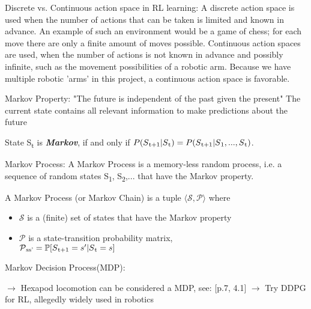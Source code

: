 Discrete vs. Continuous action space in RL learning: 
A discrete action space is used when the number of actions that can be taken is limited and known in advance. An example of such an environment would be a game of chess; for each move there are only a finite amount of moves possible.
Continuous action spaces are used, when the number of actions is not known in advance and possibly infinite, such as the movement possibilities of a robotic arm.
Because we have multiple robotic 'arms' in this project, a continuous action space is favorable.


Markov Property: "The future is independent of the past given the present"
The current state contains all relevant information to make predictions about the future
\begin{definition*}
	State S\textsubscript{t} is \textbf{\textit{Markov}}, if and only if
	$ P(S\textsubscript{t+1} | S\textsubscript{t}) = P(S\textsubscript{t+1} | S\textsubscript{1},...,S\textsubscript{t}) $.
\end{definition*}

Markov Process:
A Markov Process is a memory-less random process, i.e. a sequence of random states S\textsubscript{1}, S\textsubscript{2},... that have the Markov property.

\begin{definition*}
	A Markov Process (or Markov Chain) is a tuple $\langle\mathcal{S,P}\rangle$ where
		\begin{itemize}
		\item $\mathcal{S}$ is a (finite) set of states that have the Markov property
		\item $\mathcal{P}$ is a state-transition probability matrix,\\
		$\mathcal{P}\textsubscript{ss'} = \mathbb{P}[S\textsubscript{t+1} = s'|S\textsubscript{t}=s] $
	\end{itemize}
\end{definition*}

Markov Decision Process(MDP):

$\rightarrow$ Hexapod locomotion can be considered a MDP, see: \parencite{ouyang2021adaptive} [p.7, 4.1]
$\rightarrow$ Try DDPG for RL, allegedly widely used in robotics \parencite{ouyang2021adaptive}


